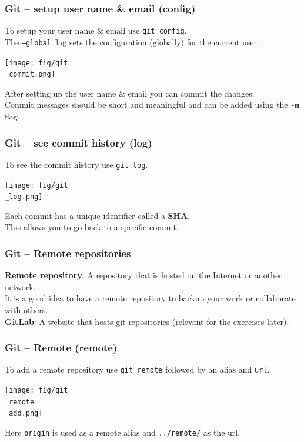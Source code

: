 \documentclass{beamer}
\begin{document}
\begin{frame}
  \frametitle{Git -- setup user name \& email (config)}
  To setup your user name \& email use \texttt{git config}.\\
  The \texttt{--global} flag sets the configuration (globally) for the current user.\\
  \begin{center}
    \texttt{[image: fig/git\\\_commit.png]}
  \end{center}
  After setting up the user name \& email you can commit the changes.\\
  Commit messages should be short and meaningful and can be added using the \texttt{-m} flag.\\
\end{frame}
\begin{frame}
  \frametitle{Git -- see commit history (log)}
  To see the commit history use \texttt{git log}.\\
  \begin{center}
    \texttt{[image: fig/git\\\_log.png]}
  \end{center}
  Each commit has a unique identifier called a \textbf{SHA}.\\
  This allows you to go back to a specific commit.\\
\end{frame}
\begin{frame}
  \frametitle{Git -- Remote repositories}
  \textbf{Remote repository}: A repository that is hosted on the Internet or another network.\\
  \vspace{5mm}
  It is a good idea to have a remote repository to backup your work or collaborate with others.\\
  \vspace{5mm}
  \textbf{GitLab}: A website that hosts git repositories (relevant for the exercises later).\\
\end{frame}
\begin{frame}
  \frametitle{Git -- Remote (remote)}
  To add a remote repository use \texttt{git remote} followed by an alias and \texttt{url}.\\
  \begin{center}
    \texttt{[image: fig/git\\\_remote\\\_add.png]}
   \end{center}
  Here \texttt{origin} is used as a remote alias and \texttt{../remote/} as the url. \\
\end{frame}
\end{document}
